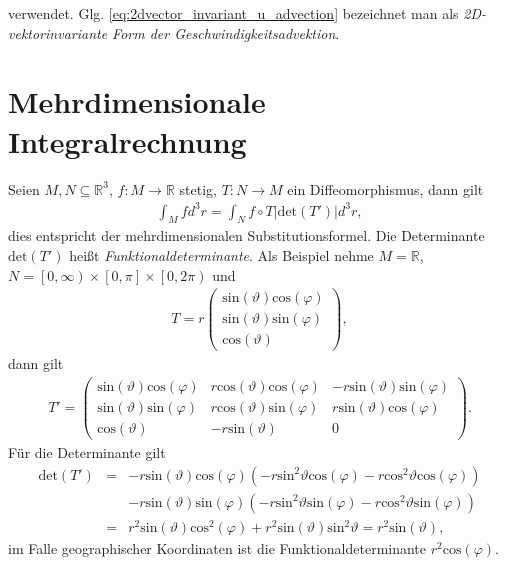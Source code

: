 \documentclass{book}
\renewcommand{\sin}{\text{sin}}
\renewcommand{\cos}{\text{cos}}
\renewcommand{\det}{\text{det}}
\begin{document}
%
verwendet. Glg. \eqref{eq:2dvector_invariant_u_advection} bezeichnet man als \textit{2D-vektorinvariante Form der Geschwindigkeitsadvektion}.

\section{Mehrdimensionale Integralrechnung}
\label{sec:mehrdimensionale_integralrechnung}

Seien $M, N\subseteq\mathbb{R}^3$, $f:M\to\mathbb{R}$ stetig, $T:N\to M$ ein Diffeomorphismus, dann gilt
%
\begin{eqnarray}
\int_{M}^{}fd^3r = \int_{N}^{}f\circ T\left|\det\left(T'\right)\right|d^3r, \label{eq:trans_formel}
\end{eqnarray}
%
dies entspricht der mehrdimensionalen Substitutionsformel. Die Determinante $\det\left(T'\right)$ heißt \textit{Funktionaldeterminante}. Als Beispiel nehme $M = \mathbb{R}$, $N = \left[0, \infty\right)\times\left[0, \pi\right]\times\left[0, 2\pi\right)$ und
%
\begin{eqnarray}
T = r\left(\begin{array}{c}
\sin\left(\vartheta\right)\cos\left(\varphi\right)\\
\sin\left(\vartheta\right)\sin\left(\varphi\right)\\
\cos\left(\vartheta\right)
\end{array}\right), 
\end{eqnarray}
%
dann gilt
%
\begin{eqnarray}
T' = \left(\begin{array}{ccc}
\sin\left(\vartheta\right)\cos\left(\varphi\right)&r\cos\left(\vartheta\right)\cos\left(\varphi\right)& -r\sin\left(\vartheta\right)\sin\left(\varphi\right)\\
\sin\left(\vartheta\right)\sin\left(\varphi\right)&r\cos\left(\vartheta\right)\sin\left(\varphi\right)&r\sin\left(\vartheta\right)\cos\left(\varphi\right)\\
\cos\left(\vartheta\right)& -r\sin\left(\vartheta\right)&0
\end{array}\right).
\end{eqnarray}
%
Für die Determinante gilt
%
\begin{eqnarray}
\det\left(T'\right) & = & -r\sin\left(\vartheta\right)\cos\left(\varphi\right)\left(-r\sin^2\vartheta\cos\left(\varphi\right) - r\cos^2\vartheta\cos\left(\varphi\right)\right)\nonumber\\
&&- r\sin\left(\vartheta\right)\sin\left(\varphi\right)\left(-r\sin^2\vartheta\sin\left(\varphi\right) - r\cos^2\vartheta\sin\left(\varphi\right)\right)\nonumber\\
& = & r^2\sin\left(\vartheta\right)\cos^2\left(\varphi\right) + r^2\sin\left(\vartheta\right)\sin^2\vartheta = r^2\sin\left(\vartheta\right), 
\end{eqnarray}
%
im Falle geographischer Koordinaten ist die Funktionaldeterminante $r^2\cos\left(\varphi\right)$.
\end{document}
